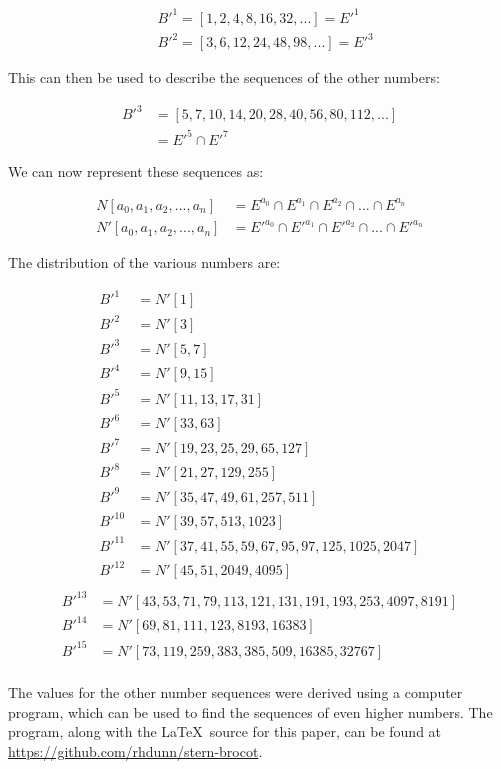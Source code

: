 \documentclass{article}
\begin{document}
\begin{displaymath}\begin{aligned}
& B'^1 = [1, 2,  4,  8, 16, 32, ...] = E'^1 \\
& B'^2 = [3, 6, 12, 24, 48, 98, ...] = E'^3
\end{aligned}\end{displaymath}

\noindent
This can then be used to describe the sequences of the other numbers:

\begin{displaymath}\begin{aligned}
B'^3
& = [5, 7, 10, 14, 20, 28, 40, 56, 80, 112, ...] \\
& = E'^5 \cap E'^7
\end{aligned}\end{displaymath}

\noindent
We can now represent these sequences as:

\begin{displaymath}\begin{aligned}
N[a_0, a_1, a_2, ..., a_n]  & = E^{a_0}  \cap E^{a_1}  \cap E^{a_2}  \cap ... \cap E^{a_n} \\
N'[a_0, a_1, a_2, ..., a_n] & = E'^{a_0} \cap E'^{a_1} \cap E'^{a_2} \cap ... \cap E'^{a_n}
\end{aligned}\end{displaymath}

\noindent
The distribution of the various numbers are:

\begin{displaymath}\begin{aligned}
B'^{1}  & = N'[1] \\
B'^{2}  & = N'[3] \\
B'^{3}  & = N'[5, 7] \\
B'^{4}  & = N'[9, 15] \\
B'^{5}  & = N'[11, 13, 17, 31] \\
B'^{6}  & = N'[33, 63] \\
B'^{7}  & = N'[19, 23, 25, 29, 65, 127] \\
B'^{8}  & = N'[21, 27, 129, 255] \\
B'^{9}  & = N'[35, 47, 49, 61, 257, 511] \\
B'^{10} & = N'[39, 57, 513, 1023] \\
B'^{11} & = N'[37, 41, 55, 59, 67, 95, 97, 125, 1025, 2047] \\
B'^{12} & = N'[45, 51, 2049, 4095] \\
\end{aligned}\end{displaymath}
\begin{displaymath}\begin{aligned}
B'^{13} & = N'[43, 53, 71, 79, 113, 121, 131, 191, 193, 253, 4097, 8191] \\
B'^{14} & = N'[69, 81, 111, 123, 8193, 16383] \\
B'^{15} & = N'[73, 119, 259, 383, 385, 509, 16385, 32767] \\
\end{aligned}\end{displaymath}

\noindent
The values for the other number sequences were derived using a computer
program, which can be used to find the sequences of even higher numbers.
The program, along with the \LaTeX\ source for this paper, can be found at
\url{https://github.com/rhdunn/stern-brocot}.
\end{document}
